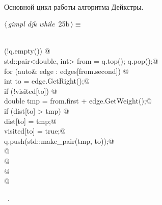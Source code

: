 \documentclass[12pt]{article}
\begin{document}
\paragraph{}
Основной цикл работы алгоритма Дейкстры.
\begin{flushleft} \small
\begin{minipage}{\linewidth}\label{scrap40}\raggedright\small
{} $\langle\,${\itshape gimpl djk while}\nobreak\ {\footnotesize {25b}}$\,\rangle\equiv$
\vspace{-1ex}
\begin{list}{}{} \item
\mbox{}\verb@@\\
\mbox{}\verb@while (!q.empty()) {@\\
\mbox{}\verb@        std::pair<double, int> from = q.top(); q.pop();@\\
\mbox{}\verb@        for (auto& edge : edges[from.second]) {@\\
\mbox{}\verb@            int to = edge.GetRight();@\\
\mbox{}\verb@            if (!visited[to]) {@\\
\mbox{}\verb@                double tmp = from.first + edge.GetWeight();@\\
\mbox{}\verb@                if (dist[to] > tmp) {@\\
\mbox{}\verb@                    dist[to] = tmp;@\\
\mbox{}\verb@                    visited[to] = true;@\\
\mbox{}\verb@                    q.push(std::make_pair(tmp, to));@\\
\mbox{}\verb@                }@\\
\mbox{}\verb@            }@\\
\mbox{}\verb@        }@\\
\mbox{}\verb@    } @\\
\mbox{}\verb@@{\NWsep}
\end{list}
\vspace{-1.5ex}
\footnotesize
\begin{list}{}{\setlength{\itemsep}{-\parsep}\setlength{\itemindent}{-\leftmargin}}
\item \NWtxtMacroRefIn\ .

\item{}
\end{list}
\end{minipage}\vspace{4ex}
\end{flushleft}
\end{document}
